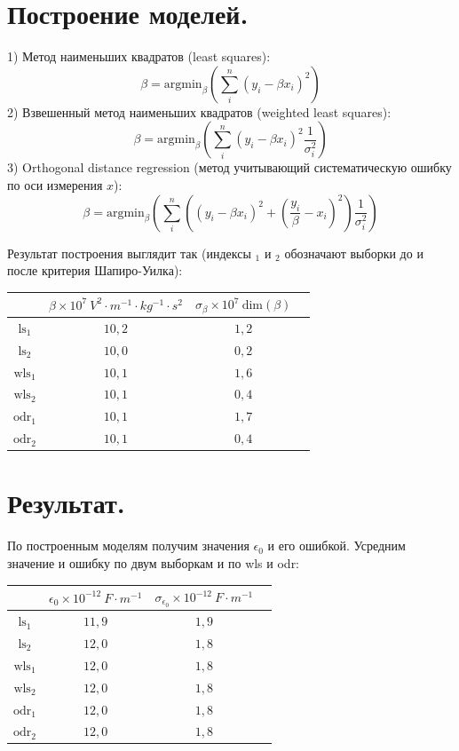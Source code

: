 \section{\label{sec:level1}Построение моделей.}
1) Метод наименьших квадратов (least squares):
$$ \beta = \text{argmin}_{\beta}(\sum_i^n (y_i - \beta x_i)^2) $$
2) Взвешенный метод наименьших квадратов (weighted least squares):
$$ \beta = \text{argmin}_{\beta}(\sum_i^n (y_i - \beta x_i)^2 \frac{1}{\sigma_i^2}) $$
3) Orthogonal distance regression (метод учитывающий систематическую ошибку по оси измерения $x$): 
$$ \beta = \text{argmin}_{\beta}(\sum_i^n ((y_i - \beta x_i)^2 + (\frac{y_i}{\beta}-x_i)^2)\frac{1}{\sigma_i^2}) $$

Результат построения выглядит так (индексы $_1$ и $_2$ обозначают выборки до и после критерия Шапиро-Уилка):

\begin{center}
\begin{tabular}{|c|*{3}{c|}}
\hline
{} & $\beta \times 10^7 \ V^2 \cdot m^{-1} \cdot kg^{-1} \cdot s^2$ & $\sigma_{\beta} \times 10^7 \ \text{dim}(\beta)$ \\
\hline
{$\text{ls}_1$} & $10,2$ & $1,2$ \\
\hline
{$\text{ls}_2$} & $10,0$ & $0,2$ \\
\hline
{$\text{wls}_1$} & $10,1$ & $1,6$ \\
\hline
{$\text{wls}_2$} & $10,1$ & $0,4$ \\
\hline
{$\text{odr}_1$} & $10,1$ & $1,7$ \\
\hline
{$\text{odr}_2$} & $10,1$ & $0,4$ \\
\hline
\end{tabular}
\end{center}

\section{\label{sec:level1}Результат.}

По построенным моделям получим значения $\epsilon_0$ и его ошибкой. Усредним значение и ошибку по двум выборкам и по wls и odr:

\begin{center}
\begin{tabular}{|c|*{3}{c|}}
\hline
{} & $\epsilon_0 \times 10^{-12} \ F \cdot m^{-1}$ & $\sigma_{\epsilon_0} \times 10^{-12} \ F \cdot m^{-1} $ \\
\hline
{$\text{ls}_1$} & $11,9$ & $1,9$\\
\hline
{$\text{ls}_2$} & $12,0$ & $1,8$ \\
\hline
{$\text{wls}_1$} & $12,0$ & $1,8$\\
\hline
{$\text{wls}_2$} & $12,0$ & $1,8$ \\
\hline
{$\text{odr}_1$} & $12,0$ & $1,8$ \\
\hline
{$\text{odr}_2$} & $12,0$ & $1,8$ \\
\hline
\end{tabular}
\end{center}

